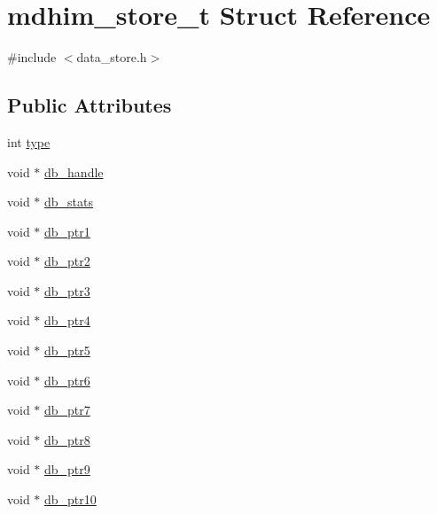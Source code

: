 \hypertarget{structmdhim__store__t}{\section{mdhim\-\_\-store\-\_\-t Struct Reference}
\label{d1/dab/structmdhim__store__t}
}


{\ttfamily \#include $<$data\-\_\-store.\-h$>$}

\subsection*{Public Attributes}
\begin{DoxyCompactItemize}
\item 
int \hyperlink{structmdhim__store__t_a00f8694bd01cc8cfda7479b7384e083b}{type}
\item 
void $\ast$ \hyperlink{structmdhim__store__t_ab9c004b5de88a17f058146ef0a91e696}{db\-\_\-handle}
\item 
void $\ast$ \hyperlink{structmdhim__store__t_a6313bc8d5b21fa995c067f256fff1f83}{db\-\_\-stats}
\item 
void $\ast$ \hyperlink{structmdhim__store__t_a88c99ce5295e88a8afaac3041bd73fbe}{db\-\_\-ptr1}
\item 
void $\ast$ \hyperlink{structmdhim__store__t_a026cd325c0842df093a5d097c975d06a}{db\-\_\-ptr2}
\item 
void $\ast$ \hyperlink{structmdhim__store__t_ab0ef24f26ceaefd6d7149b939afec79c}{db\-\_\-ptr3}
\item 
void $\ast$ \hyperlink{structmdhim__store__t_a7c7bb30bc1e9a4474f36461a45add7dc}{db\-\_\-ptr4}
\item 
void $\ast$ \hyperlink{structmdhim__store__t_a16ef23e16acf5805e5aedbc083d58d21}{db\-\_\-ptr5}
\item 
void $\ast$ \hyperlink{structmdhim__store__t_a8735e088b5c11a1da361d809d827342c}{db\-\_\-ptr6}
\item 
void $\ast$ \hyperlink{structmdhim__store__t_ae0fb1705ae0666ee085aa08a050601b2}{db\-\_\-ptr7}
\item 
void $\ast$ \hyperlink{structmdhim__store__t_a985c64544d540911fa449727037894a6}{db\-\_\-ptr8}
\item 
void $\ast$ \hyperlink{structmdhim__store__t_a2c02c5ae650bd0315ff844bdfbf9846b}{db\-\_\-ptr9}
\item 
void $\ast$ \hyperlink{structmdhim__store__t_a01c12aa1c69a352aecd5c6732880b52b}{db\-\_\-ptr10}
\item 

\end{DoxyCompactItemize}
